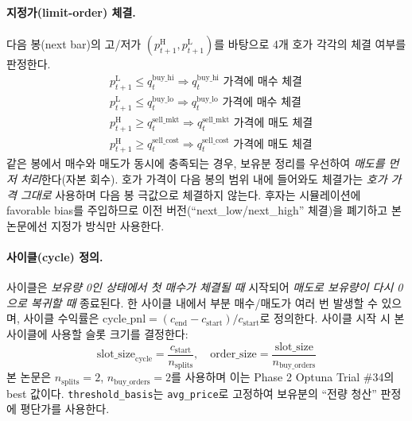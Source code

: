 \documentclass[11pt, a4paper]{article}
\begin{document}
\paragraph{지정가(limit-order) 체결.}
다음 봉(next bar)의 고/저가 $(p^{\mathrm{H}}_{t+1}, p^{\mathrm{L}}_{t+1})$를
바탕으로 4개 호가 각각의 체결 여부를 판정한다.
\begin{equation}
\begin{aligned}
&p^{\mathrm{L}}_{t+1} \leq q^{\mathrm{buy\_hi}}_t  \Rightarrow
\text{$q^{\mathrm{buy\_hi}}_t$ 가격에 매수 체결} \\
&p^{\mathrm{L}}_{t+1} \leq q^{\mathrm{buy\_lo}}_t  \Rightarrow
\text{$q^{\mathrm{buy\_lo}}_t$ 가격에 매수 체결} \\
&p^{\mathrm{H}}_{t+1} \geq q^{\mathrm{sell\_mkt}}_t \Rightarrow
\text{$q^{\mathrm{sell\_mkt}}_t$ 가격에 매도 체결} \\
&p^{\mathrm{H}}_{t+1} \geq q^{\mathrm{sell\_cost}}_t \Rightarrow
\text{$q^{\mathrm{sell\_cost}}_t$ 가격에 매도 체결}
\end{aligned}
\end{equation}
같은 봉에서 매수와 매도가 동시에 충족되는 경우, 보유분 정리를 우선하여
\emph{매도를 먼저 처리}한다(자본 회수). 호가 가격이 다음 봉의 범위 내에 들어와도
체결가는 \emph{호가 가격 그대로} 사용하며 다음 봉 극값으로 체결하지 않는다. 후자는
시뮬레이션에 favorable bias를 주입하므로 이전 버전(``next\_low/next\_high''
체결)을 폐기하고 본 논문에선 지정가 방식만 사용한다.

\paragraph{사이클(cycle) 정의.}
사이클은 \emph{보유량 0인 상태에서 첫 매수가 체결될 때} 시작되어
\emph{매도로 보유량이 다시 0으로 복귀할 때} 종료된다. 한 사이클 내에서 부분
매수/매도가 여러 번 발생할 수 있으며, 사이클 수익률은
$\mathrm{cycle\_pnl} = (c_{\text{end}} - c_{\text{start}}) / c_{\text{start}}$로
정의한다. 사이클 시작 시 본 사이클에 사용할 슬롯 크기를 결정한다:
\begin{equation}
\text{slot\_size}_{\text{cycle}} =
\frac{c_{\text{start}}}{n_{\text{splits}}}, \quad
\text{order\_size} = \frac{\text{slot\_size}}{n_{\text{buy\_orders}}}
\end{equation}
본 논문은 $n_{\text{splits}}=2$, $n_{\text{buy\_orders}}=2$를 사용하며 이는
Phase 2 Optuna Trial \#34의 best 값이다. \texttt{threshold\_basis}는
\texttt{avg\_price}로 고정하여 보유분의 ``전량 청산'' 판정에 평단가를 사용한다.
\end{document}
